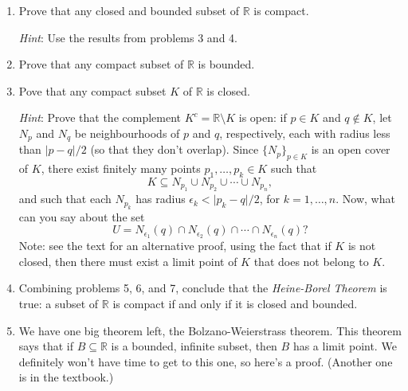 \documentclass[letterpaper,12pt]{article}
\newcommand{\N}{\mathbb{N}}
\newcommand{\R}{\mathbb{R}}
\newcommand{\abs}[1]{\lvert #1\rvert}
\begin{document}
\begin{enumerate}
{\em Hint}: Use proof by contradiction, and the following steps: 
\begin{enumerate}
\item Let $I_0=[a,b]$ and suppose there exists an open cover $\{U_\alpha\}$ of $I_0$ for which there is no finite subcover. Then divide the interval in half: at least one of the two intervals $[a,(a+b)/2]$ and $[(a+b)/2,b]$ cannot be covered by finitely many of the $U_\alpha$ (why?). Call this interval $I_1$.
\item Explain how to repeat the procedure in part (a) to obtain a sequence of intervals $I_1, I_2, I_3, \ldots$ such that each $I_n$ cannot be covered by finitely many of the $U_\alpha$.
\item Note that there must be some point $x_0\in \R$ such that $x\in I_n$ for all $n\in \N$. (Sub-hint: Nested Intervals Theorem)
\item Since the collection $\{U_\alpha\}$ covers $[a,b]$ and $x_0\in [a,b]$, we must have $x_0\in U_{\beta}$ for some open set $U_{\beta}$. Explain why there must exist some $r>0$ such that $(x_0-r,x_0+r)$ is contained in $U_{\beta}$.
\item Notice that each interval $I_n$ has length $(b-a)/2^n$. Explain why this means that we must have $I_n\subseteq U_{\beta}$ for some $n\in \N$.
\item Explain why the result from part (e) results in a contradiction.
\end{enumerate}
\item Prove that any closed and bounded subset of $\R$ is compact.

{\em Hint}: Use the results from problems 3 and 4.

\item Prove that any compact subset of $\R$ is bounded.

\item Pove that any compact subset $K$ of $\R$ is closed.

{\em Hint}: Prove that the complement $K^c=\R\setminus K$ is open: if $p\in K$ and $q\notin K$, let $N_p$ and $N_q$ be neighbourhoods of $p$ and $q$, respectively, each with radius less than $\abs{p-q}/2$ (so that they don't overlap). Since $\{N_p\}_{p\in K}$ is an open cover of $K$, there exist finitely many points $p_1,\ldots, p_k\in K$ such that
\[
 K\subseteq N_{p_1}\cup N_{p_2}\cup \cdots \cup N_{p_n},
\]
and such that each $N_{p_k}$ has radius $\epsilon_k<\abs{p_k-q}/2$, for $k=1,\ldots, n$. Now, what can you say about the set
\[
 U = N_{\epsilon_1}(q)\cap N_{\epsilon_2}(q)\cap\cdots \cap N_{\epsilon_n}(q)?
\]
Note: see the text for an alternative proof, using the fact that if $K$ is not closed, then there must exist a limit point of $K$ that does not belong to $K$.
\item Combining problems 5, 6, and 7, conclude that the {\em Heine-Borel Theorem} is true: a subset of $\R$ is compact if and only if it is closed and bounded.
\item We have one big theorem left, the Bolzano-Weierstrass theorem. This theorem says that if $B\subseteq \R$ is a bounded, infinite subset, then $B$ has a limit point. We definitely won't have time to get to this one, so here's a proof. (Another one is in the textbook.)


\end{enumerate}
\end{document}
